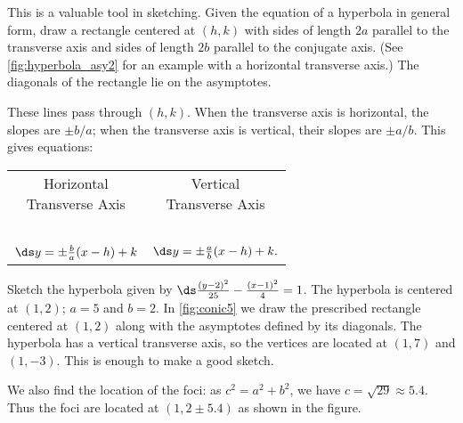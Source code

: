 This is a valuable tool in sketching. Given the equation of a hyperbola in general form, draw a rectangle centered at $(h,k)$ with sides of length $2a$ parallel to the transverse axis and sides of length $2b$ parallel to the conjugate axis. (See \autoref{fig:hyperbola_asy2} for an example with a horizontal transverse axis.) The diagonals of the rectangle lie on the asymptotes. 

These lines pass through $(h,k)$.  When the transverse axis is horizontal, the slopes are $\pm b/a$; when the transverse axis is vertical, their slopes are $\pm a/b$. This gives equations:
\begin{center}
\begin{tabular}{cc}
\parbox{100pt}{\centering Horizontal \\ Transverse Axis} & \parbox{100pt}{\centering Vertical \\ Transverse Axis} \\ \ \\
$\ds y=\pm\frac ba(x-h)+k$  &$\ds  y=\pm\frac ab(x-h)+k.$
\end{tabular}
\end{center}


\begin{example}\label{ex_conic5}
Sketch the hyperbola given by $\ds \frac{(y-2)^2}{25}-\frac{(x-1)^2}{4}=1$.
\solution
The hyperbola is centered at $(1,2)$; $a=5$ and $b=2$.
In \autoref{fig:conic5} we draw the prescribed rectangle centered at $(1,2)$ along with the asymptotes defined by its diagonals. The hyperbola has a vertical transverse axis, so the vertices are located at $(1,7)$ and $(1,-3)$. This is enough to make a good sketch.

We also find the location of the foci: as $c^2= a^2+b^2$, we have $c=\sqrt{29}\approx 5.4$. Thus the foci are located at $(1,2\pm 5.4)$ as shown in the figure.
\end{example}


